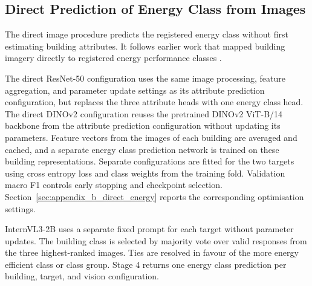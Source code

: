 \subsection{Direct Prediction of Energy Class from Images}
\label{sec:direct_energy_class_prediction}

The direct image procedure predicts the registered energy class without first estimating building attributes.
It follows earlier work that mapped building imagery directly to registered energy performance classes \parencite{mayer2023uk,mayer2023dk}.

The direct ResNet-50 configuration uses the same image processing, feature aggregation, and parameter update settings as its attribute prediction configuration, but replaces the three attribute heads with one energy class head.
The direct DINOv2 configuration reuses the pretrained DINOv2 ViT-B/14 backbone from the attribute prediction configuration without updating its parameters. Feature vectors from the images of each building are averaged and cached, and a separate energy class prediction network is trained on these building representations.
Separate configurations are fitted for the two targets using cross entropy loss and class weights from the training fold.
Validation macro F1 controls early stopping and checkpoint selection.
Section~\ref{sec:appendix_b_direct_energy} reports the corresponding optimisation settings.

InternVL3-2B uses a separate fixed prompt for each target without parameter updates.
The building class is selected by majority vote over valid responses from the three highest-ranked images.
Ties are resolved in favour of the more energy efficient class or class group.
Stage 4 returns one energy class prediction per building, target, and vision configuration.
